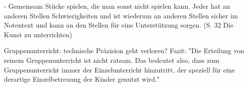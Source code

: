 - Gemeinsam Stücke spielen, die man sonst nicht spielen kann. Jeder hat an
anderen Stellen Schwierigkeiten und ist wiederum an anderen Stellen sicher im
Notentext und kann an den Stellen für eine Unterstützung sorgen. (S. 32 Die
Kunst zu unterrichten)

Gruppenunterricht: technische Präzision geht verloren? 
Fazit: "Die  Erteilung von reinem Gruppenunterricht ist nicht ratsam. Das
bedeutet also, dass zum Gruppenunterricht immer der Einzelunterricht hinzutritt,
der speziell für eine derartige Einzelbetreuung der Kinder genutzt wird."
\autocite[57]{ernst:die_zukunftsfaehige_musikschule}

















